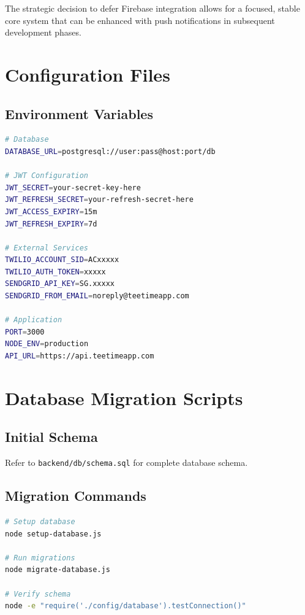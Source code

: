 \documentclass[12pt,a4paper]{article}
\begin{document}
The strategic decision to defer Firebase integration allows for a focused, stable core system that can be enhanced with push notifications in subsequent development phases.

\appendix

\section{Configuration Files}

\subsection{Environment Variables}
\begin{lstlisting}[language=bash]
# Database
DATABASE_URL=postgresql://user:pass@host:port/db

# JWT Configuration
JWT_SECRET=your-secret-key-here
JWT_REFRESH_SECRET=your-refresh-secret-here
JWT_ACCESS_EXPIRY=15m
JWT_REFRESH_EXPIRY=7d

# External Services
TWILIO_ACCOUNT_SID=ACxxxxx
TWILIO_AUTH_TOKEN=xxxxx
SENDGRID_API_KEY=SG.xxxxx
SENDGRID_FROM_EMAIL=noreply@teetimeapp.com

# Application
PORT=3000
NODE_ENV=production
API_URL=https://api.teetimeapp.com
\end{lstlisting}

\section{Database Migration Scripts}

\subsection{Initial Schema}
Refer to \texttt{backend/db/schema.sql} for complete database schema.

\subsection{Migration Commands}
\begin{lstlisting}[language=bash]
# Setup database
node setup-database.js

# Run migrations
node migrate-database.js

# Verify schema
node -e "require('./config/database').testConnection()"
\end{lstlisting}
\end{document}
